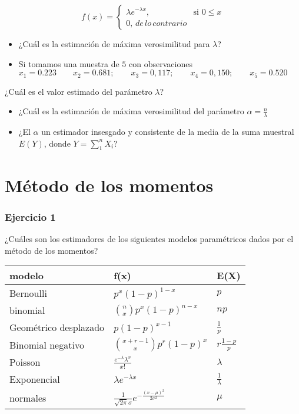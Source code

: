 \documentclass[
]{book}
\begin{document}
\[
    f(x)=
\begin{cases}
    \lambda e^{-\lambda x},& \text{si } 0 \leq x\\
    0, \, de\, lo\, contrario
\end{cases}
\]

\begin{itemize}
\item
  ¿Cuál es la estimación de máxima verosimilitud para \(\lambda\)?
\item
  Si tomamos una muestra de \(5\) con observaciones
  \(x_1 = 0.223 \qquad x_2 = 0.681; \qquad x_3 = 0,117; \qquad x_4 = 0,150; \qquad x_5 = 0.520\)
\end{itemize}

¿Cuál es el valor estimado del parámetro \(\lambda\)?

\begin{itemize}
\item
  ¿Cuál es la estimación de máxima verosimilitud del parámetro \(\alpha=\frac{n}{\lambda}\)
\item
  ¿El \(\alpha\) un estimador insesgado y consistente de la media de la suma muestral \(E(Y)\), donde \(Y=\sum_1^n X_i\)?
\end{itemize}

\hypertarget{muxe9todo-de-los-momentos-11}{%
\section{Método de los momentos}\label{muxe9todo-de-los-momentos-11}}

\hypertarget{ejercicio-1-8}{%
\subsubsection{Ejercicio 1}\label{ejercicio-1-8}}

¿Cuáles son los estimadores de los siguientes modelos paramétricos dados por el método de los momentos?

\begin{longtable}[]{@{}lll@{}}
\toprule
modelo & f(x) & E(X) \\
\midrule
\endhead
Bernoulli & \(p^x(1-p)^{1-x}\) & \(p\) \\
binomial & \(\binom n x p^x(1-p)^{n-x}\) & \(np\) \\
Geométrico desplazado & \(p(1-p)^{x-1}\) & \(\frac{1}{p}\) \\
Binomial negativo & \(\binom {x+r-1} x p^r(1-p)^x\) & \(r\frac{1-p}{p}\) \\
Poisson & \(\frac{e^{-\lambda}\lambda^x}{x!}\) & \(\lambda\) \\
Exponencial & \(\lambda e^{-\lambda x}\) & \(\frac{1}{\lambda}\) \\
normales & \(\frac{1}{\sqrt{2\pi}\sigma}e^{-\frac{(x-\mu)^2}{2\sigma^2}}\) & \(\mu\) \\
\bottomrule
\end{longtable}
\end{document}
